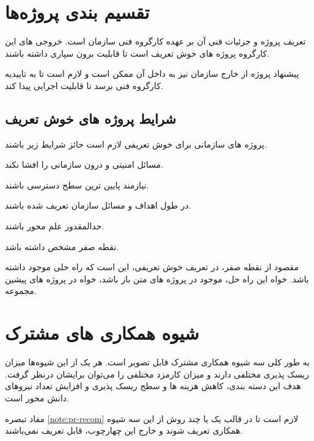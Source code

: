 \section{تقسیم بندی پروژه‌ها}\label{sec:projects}


تعریف پروژه و جزئیات فنی آن بر عهده کارگروه فنی سازمان است. خروجی های این کارگروه پروژه های خوش تعریف است تا قابلیت برون سپاری داشته باشند.

\begin{note}\label{note:pr-recom}
	پیشنهاد پروژه از خارج سازمان نیز به داخل آن ممکن است و لازم است تا به تاییدیه کارگروه فنی برسد تا قابلیت اجرایی پیدا کند.
\end{note}


\subsection{شرایط پروژه های خوش تعریف}
پروژه های سازمانی برای خوش تعریفی لازم است حائز شرایط زیر باشند. 

\begin{alphabetlist}
	\item
	مسائل امنیتی و درون سازمانی را افشا نکند.
	\item 
	نیازمند پایین ترین سطح دسترسی باشند.
	\item 
	در طول اهداف و مسائل سازمان تعریف شده باشند.
	\item
	حدالمقدور علم محور باشند.
	\item 
	نقطه صفر مشخص داشته باشد.
\end{alphabetlist}

\begin{note}
	مقصود از نقطه صفر، در تعریف خوش تعریفی، این است که راه حلی موجود داشته باشد. خواه این راه حل، موجود در پروژه های متن باز باشد، خواه در پروژه های پیشین مجموعه.
\end{note}





\section{شیوه همکاری های مشترک}

به طور کلی سه شیوه همکاری مشترک قابل تصویر است. هر یک از این شیوه‌ها میزان ریسک پذیری مختلفی دارند و میزان کارمزد مختلفی را می‌توان برایشان درنظر گرفت. هدف این دسته بندی، کاهش هزینه ها و سطح ریسک پذیری و افزایش تعداد نیروهای دانش محور است.

\begin{note}
	مفاد تبصره
	\ref{note:pr-recom}
	لازم است تا در قالب یک یا چند روش از این سه شیوه همکاری تعریف شوند و خارج این چهارچوب، قابل تعریف نمی‌باشند. 
\end{note}



